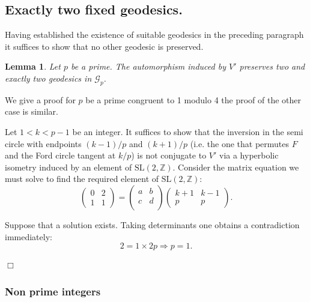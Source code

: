 \documentclass[12pt,a4paper]{amsart}
\newtheorem{lem}[thm]{Lemma}
\def\ZZ{\mathbb{Z}}
\def\sl2{\mathrm{SL}(2, \ZZ)}
\def\ggp{\mathcal{G}_p}
\begin{document}
\subsection{Exactly two fixed geodesics.}

Having established the existence of suitable geodesics in the preceding paragraph
it suffices to show that no other geodesic is preserved.


\begin{lem} \label{the end}
Let $p$ be a prime.
The automorphism induced by $V'$ preserves two and exactly two geodesics in $\ggp$.
\end{lem}


\proof 
We give a proof for  $p$ be a prime congruent to 1 modulo 4
the proof of the other case is similar.

Let $1< k < p-1$  be an integer. 
It suffices to show that the inversion in the semi circle with endpoints  
 $(k-1)/p$ and  $(k+1)/p$
(i.e. the one that permutes $F$ and the Ford circle tangent at $k/p$)
is not conjugate to $V'$ 
via a hyperbolic isometry induced by an element of $\sl2$.
Consider the  matrix equation we must solve 
to find the required element of $\sl2$:
\begin{equation}
\begin{pmatrix}
0& 2\\
1 & 1
\end{pmatrix}
= 
\begin{pmatrix}
a & b \\
c & d\\
\end{pmatrix}
\begin{pmatrix}
k + 1 & k-1 \\
p  & p
\end{pmatrix}.
\end{equation}

Suppose that a solution exists. Taking determinants one obtains a contradiction immediately:
$$ 2 = 1 \times 2p \Rightarrow p = 1.$$

\hfill $\Box$


\subsubsection{Non prime integers}
\end{document}
